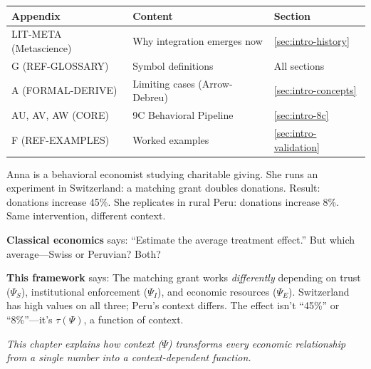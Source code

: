 \begin{tcolorbox}[
    colback=yellow!10!white,
    colframe=orange!75!black,
    title={\textbf{Appendix References for This Chapter}},
    fonttitle=\bfseries
]
\small
\begin{tabular}{@{}p{3.5cm}p{5.5cm}p{3.5cm}@{}}
\textbf{Appendix} & \textbf{Content} & \textbf{Section} \\
\midrule
LIT-META (Metascience) & Why integration emerges now & \ref{sec:intro-history} \\
G (REF-GLOSSARY) & Symbol definitions & All sections \\
A (FORMAL-DERIVE) & Limiting cases (Arrow-Debreu) & \ref{sec:intro-concepts} \\
AU, AV, AW (CORE) & 9C Behavioral Pipeline & \ref{sec:intro-8c} \\
F (REF-EXAMPLES) & Worked examples & \ref{sec:intro-validation}
\end{tabular}
\end{tcolorbox}

\begin{tcolorbox}[colback=gray!5!white, colframe=gray!75!black,
    title=\textbf{Why This Matters: Anna's Dilemma}]
\small
Anna is a behavioral economist studying charitable giving. She runs an experiment in Switzerland: a matching grant doubles donations. Result: donations increase 45\%. She replicates in rural Peru: donations increase 8\%. Same intervention, different context.

\textbf{Classical economics} says: ``Estimate the average treatment effect.'' But which average---Swiss or Peruvian? Both?

\textbf{This framework} says: The matching grant works \emph{differently} depending on trust ($\Psi_S$), institutional enforcement ($\Psi_I$), and economic resources ($\Psi_E$). Switzerland has high values on all three; Peru's context differs. The effect isn't ``45\%'' or ``8\%''---it's $\tau(\Psi)$, a function of context.

\textit{This chapter explains how context ($\Psi$) transforms every economic relationship from a single number into a context-dependent function.}
\end{tcolorbox}

